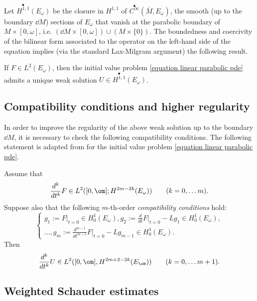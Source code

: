 \documentclass[hidelinks, 12pt, oneside, reqno]{amsart}
\begin{document}
Let $\overset{\bullet}{H^{1,1}}(E_\omega)$ be the closure in $H^{1,1}$ of $\overset{\bullet}{C^\infty}(\overline{M},E_\omega)$, the smooth (up to the boundary $\dd M$) sections of $E_\omega$ that vanish at the parabolic boundary of $M \times [0,\omega]$, i.e. $(\dd M \times [0,\omega]) \cup (M \times \{0\})$. The boundedness and coercivity of the bilinear form associated to the operator on the left-hand side of the equation implies (via the standard Lax-Milgram argument) the following result.

\begin{thm}\cite[Theorem 3.8]{Baker}\label{theorem existence of linear weak solution}
    If $F \in L^2(E_\omega)$, then the initial value problem \eqref{equation linear parabolic pde} admits a unique weak solution $U \in \overset{\bullet}{H^{1,1}}(E_\omega)$. 
\end{thm}


\subsection{Compatibility conditions and higher regularity}\label{subsection compatibility conditions}

In order to improve the regularity of the above weak solution up to the boundary $\dd M$, it is necessary to check the following compatibility conditions. The following statement is adapted from \cite[Theorem 6, p. 386]{EvansPDE} for the initial value problem \eqref{equation linear parabolic pde}. 

\begin{thm}\cite{EvansPDE}\label{theorem higher regularity linear par pde}
Assume that 
\[
\frac{d^k}{dt^k}F \in L^2([0,\om]; H^{2m-2k}(E_\omega))\qquad (k = 0, \ldots m).
\]
Suppose also that the following $m$-th-order \textit{compatibility conditions} hold:
\[
\left\{
\begin{array}{lr}
g_1 := F|_{t=0} \in H^1_0(E_\omega), g_2 := \frac{d}{dt}F\big|_{t=0} - Lg_1 \in H^1_0(E_\omega), \\
\ldots, g_m := \frac{d^{m-1}}{dt^{m-1}}F\big|_{t=0} - Lg_{m-1} \in H^1_0(E_\omega).
\end{array}
\right.
\]
Then
\[
\frac{d^k}{dt^k} U \in L^2([0,\om],H^{2m+2 -2k}(E_\om)) \qquad (k = 0, \ldots m + 1).
\]
\end{thm}

\subsection{Weighted Schauder estimates}\label{subsection weighted schauder}
\end{document}
